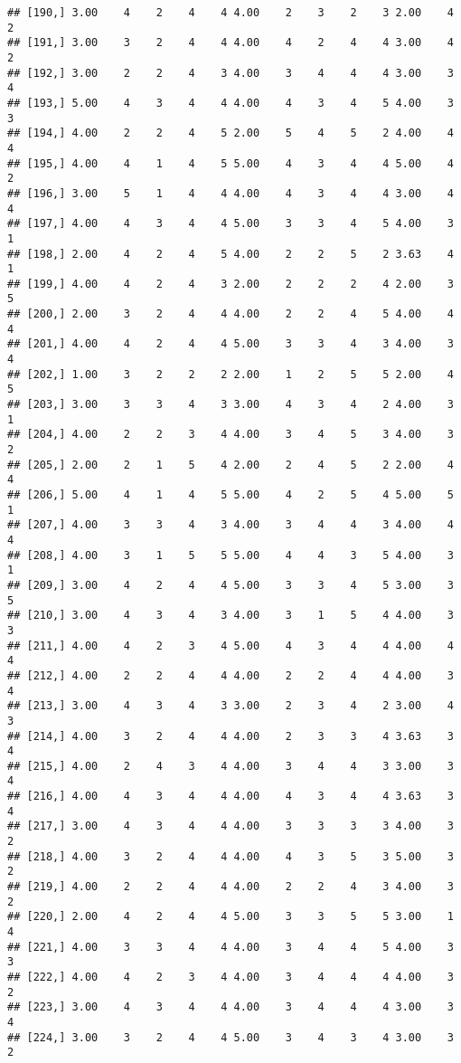\documentclass[]{article}
\begin{document}
\begin{verbatim}
## [190,] 3.00    4    2    4    4 4.00    2    3    2    3 2.00    4    2
## [191,] 3.00    3    2    4    4 4.00    4    2    4    4 3.00    4    2
## [192,] 3.00    2    2    4    3 4.00    3    4    4    4 3.00    3    4
## [193,] 5.00    4    3    4    4 4.00    4    3    4    5 4.00    3    3
## [194,] 4.00    2    2    4    5 2.00    5    4    5    2 4.00    4    4
## [195,] 4.00    4    1    4    5 5.00    4    3    4    4 5.00    4    2
## [196,] 3.00    5    1    4    4 4.00    4    3    4    4 3.00    4    4
## [197,] 4.00    4    3    4    4 5.00    3    3    4    5 4.00    3    1
## [198,] 2.00    4    2    4    5 4.00    2    2    5    2 3.63    4    1
## [199,] 4.00    4    2    4    3 2.00    2    2    2    4 2.00    3    5
## [200,] 2.00    3    2    4    4 4.00    2    2    4    5 4.00    4    4
## [201,] 4.00    4    2    4    4 5.00    3    3    4    3 4.00    3    4
## [202,] 1.00    3    2    2    2 2.00    1    2    5    5 2.00    4    5
## [203,] 3.00    3    3    4    3 3.00    4    3    4    2 4.00    3    1
## [204,] 4.00    2    2    3    4 4.00    3    4    5    3 4.00    3    2
## [205,] 2.00    2    1    5    4 2.00    2    4    5    2 2.00    4    4
## [206,] 5.00    4    1    4    5 5.00    4    2    5    4 5.00    5    1
## [207,] 4.00    3    3    4    3 4.00    3    4    4    3 4.00    4    4
## [208,] 4.00    3    1    5    5 5.00    4    4    3    5 4.00    3    1
## [209,] 3.00    4    2    4    4 5.00    3    3    4    5 3.00    3    5
## [210,] 3.00    4    3    4    3 4.00    3    1    5    4 4.00    3    3
## [211,] 4.00    4    2    3    4 5.00    4    3    4    4 4.00    4    4
## [212,] 4.00    2    2    4    4 4.00    2    2    4    4 4.00    3    4
## [213,] 3.00    4    3    4    3 3.00    2    3    4    2 3.00    4    3
## [214,] 4.00    3    2    4    4 4.00    2    3    3    4 3.63    3    4
## [215,] 4.00    2    4    3    4 4.00    3    4    4    3 3.00    3    4
## [216,] 4.00    4    3    4    4 4.00    4    3    4    4 3.63    3    4
## [217,] 3.00    4    3    4    4 4.00    3    3    3    3 4.00    3    2
## [218,] 4.00    3    2    4    4 4.00    4    3    5    3 5.00    3    2
## [219,] 4.00    2    2    4    4 4.00    2    2    4    3 4.00    3    2
## [220,] 2.00    4    2    4    4 5.00    3    3    5    5 3.00    1    4
## [221,] 4.00    3    3    4    4 4.00    3    4    4    5 4.00    3    3
## [222,] 4.00    4    2    3    4 4.00    3    4    4    4 4.00    3    2
## [223,] 3.00    4    3    4    4 4.00    3    4    4    4 3.00    3    4
## [224,] 3.00    3    2    4    4 5.00    3    4    3    4 3.00    3    2

\end{verbatim}
\end{document}
